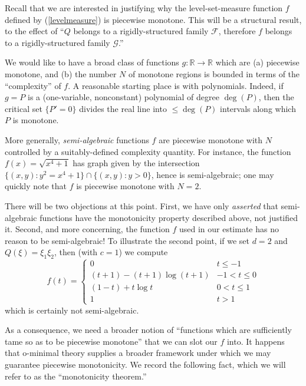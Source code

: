 \documentclass[12pt]{article}
\let\oldref\ref
\renewcommand{\ref}[1]{(\oldref{#1})}
\newcommand{\R}{\mathbb{R}}
\theoremstyle{definition}
\theoremstyle{remark}
\numberwithin{equation}{section}
\begin{document}
Recall that we are interested in justifying why the level-set-measure function $f$ defined by \ref{levelmeasure} is piecewise monotone. This will be a structural result, to the effect of ``$Q$ belongs to a rigidly-structured family $\mathcal{F}$, therefore $f$ belongs to a rigidly-structured family $\mathcal{G}$.''

We would like to have a broad class of functions $g:\R\to\R$ which are (a) piecewise monotone, and (b) the number $N$ of monotone regions is bounded in terms of the ``complexity'' of $f$. A reasonable starting place is with polynomials. Indeed, if $g=P$ is a (one-variable, nonconstant) polynomial of degree $\deg(P)$, then the critical set $\{P'=0\}$ divides the real line into $\leq\deg(P)$ intervals along which $P$ is monotone.

More generally, \textit{semi-algebraic} functions $f$ are piecewise monotone with $N$ controlled by a suitably-defined complexity quantity. For instance, the function $f(x)=\sqrt{x^4+1}$ has graph given by the intersection $\{(x,y):y^2=x^4+1\}\cap\{(x,y):y>0\}$, hence is semi-algebraic; one may quickly note that $f$ is piecewise monotone with $N=2$.

There will be two objections at this point. First, we have only \textit{asserted} that semi-algebraic functions have the monotonicity property described above, not justified it. Second, and more concerning, the function $f$ used in our estimate has no reason to be semi-algebraic! To illustrate the second point, if we set $d=2$ and $Q(\xi)=\xi_1\xi_2$, then (with $c=1$) we compute
\begin{equation*}
    f(t)=\begin{cases}
        0 & t\leq -1\\
        (t+1)-(t+1)\log(t+1) & -1<t\leq 0\\
        (1-t)+t\log t & 0<t\leq 1\\
        1 & t>1
    \end{cases}
\end{equation*}
which is certainly not semi-algebraic.

As a consequence, we need a broader notion of ``functions which are sufficiently tame so as to be piecewise monotone'' that we can slot our $f$ into. It happens that o-minimal theory supplies a broader framework under which we may guarantee piecewise monotonicity. We record the following fact, which we will refer to as the ``monotonicity theorem.''
\end{document}
